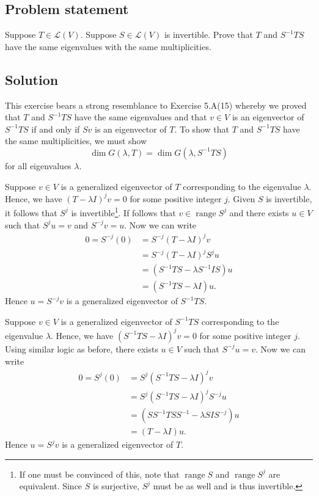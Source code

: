 \documentclass{article}
\begin{document}
\subsection*{Problem statement}
Suppose $T\in\mathcal{L}(V)$. Suppose $S\in\mathcal{L}(V)$ is invertible. Prove that $T$ and $S^{-1}TS$ have the same eigenvalues with the same multiplicities.

\subsection*{Solution}
This exercise bears a strong resemblance to Exercise 5.A(15) whereby we proved that $T$ and $S^{-1}TS$ have the same eigenvalues and that $v\in V$ is an eigenvector of $S^{-1}TS$ if and only if $Sv$ is an eigenvector of $T$. To show that $T$ and $S^{-1}TS$ have the same multiplicities, we must show 
\[\operatorname{dim}G(\lambda,T)=\operatorname{dim}G(\lambda,S^{-1}TS)\]
for all eigenvalues $\lambda$.

Suppose $v\in V$ is a generalized eigenvector of $T$ corresponding to the eigenvalue $\lambda$. Hence, we have $(T-\lambda I)^jv=0$ for some positive integer $j$. Given $S$ is invertible, it follows that $S^{j}$ is invertible\footnote{If one must be convinced of this, note that $\operatorname{range}S$ and $\operatorname{range}S^j$ are equivalent. Since $S$ is surjective, $S^j$ must be as well and is thus invertible.}. If follows that $v\in\operatorname{range}S^j$ and there exists $u\in V$ such that $S^ju=v$ and $S^{-j}v=u$. Now we can write
\begin{align*}
    0=S^{-j}(0)&=S^{-j}(T-\lambda I)^jv\\
    &=S^{-j}(T-\lambda I)^jS^ju\\
    &=(S^{-1}TS-\lambda S^{-1}IS)u\\
    &=(S^{-1}TS-\lambda I)u.
\end{align*}
Hence $u=S^{-j}v$ is a generalized eigenvector of $S^{-1}TS$.

Suppose $v\in V$ is a generalized eigenvector of $S^{-1}TS$ corresponding to the eigenvalue $\lambda$. Hence, we have $(S^{-1}TS-\lambda I)^jv=0$ for some positive integer $j$. Using similar logic as before, there exists $u\in V$ such that $S^{-j}u=v$. Now we can write
\begin{align*}
    0=S^{j}(0)&=S^{j}(S^{-1}TS-\lambda I)^jv\\
    &=S^{j}(S^{-1}TS-\lambda I)^jS^{-j}u\\
    &=(SS^{-1}TSS^{-1}-\lambda SIS^{-j})u\\
    &=(T-\lambda I)u.
\end{align*}
Hence $u=S^{j}v$ is a generalized eigenvector of $T$.
\end{document}
